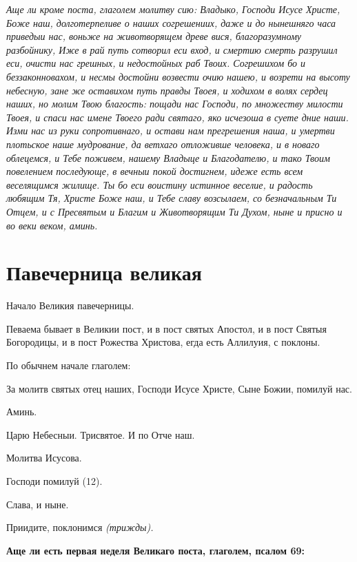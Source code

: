 \itshape Аще ли кроме поста, глаголем молитву сию:\normalfont{} Владыко, Господи Исусе Христе, Боже наш, долготерпеливе о наших согрешениих, даже и до нынешняго часа приведыи нас, воньже на животворящем древе вися, благоразумному разбойнику, Иже в рай путь сотворил еси вход, и смертию смерть разрушил еси, очисти нас грешных, и недостойных раб Твоих. Согрешихом бо и беззаконновахом, и несмы достойни возвести очию нашею, и возрети на высоту небесную, зане же оставихом путь правды Твоея, и ходихом в волях сердец наших, но молим Твою благость: пощади нас Господи, по множеству милости Твоея, и спаси нас имене Твоего ради святаго, яко исчезоша в суете дние наши. Изми нас из руки сопротивнаго, и остави нам прегрешения наша, и умертви плотьское наше мудрование, да ветхаго отложивше человека, и в новаго облецемся, и Тебе поживем, нашему Владыце и Благодателю, и тако Твоим повелением последующе, в вечныи покой достигнем, идеже есть всем веселящимся жилище. Ты бо еси воистину истинное веселие, и радость любящим Тя, Христе Боже наш, и Тебе славу возсылаем, со безначальным Ти Отцем, и с Пресвятым и Благим и Животворящим Ти Духом, ныне и присно и во веки веком, аминь.




\section{Павечерница великая}
 


Начало Великия павечерницы.


Певаема бывает в Великии пост, и в пост святых Апостол, и в пост Святыя Богородицы, и в пост Рожества Христова, егда есть Аллилуия, с поклоны.


По обычнем начале глаголем:


За молитв святых отец наших, Господи Исусе Христе, Сыне Божии, помилуй нас.


Аминь.


Царю Небесныи. Трисвятое. И по Отче наш.


Молитва Исусова.


Господи помилуй (12).


Слава, и ныне.


Приидите, поклонимся \itshape (трижды)\normalfont{}.







\bfseries Аще ли есть первая неделя Великаго поста, глаголем, псалом 69:\normalfont{}



